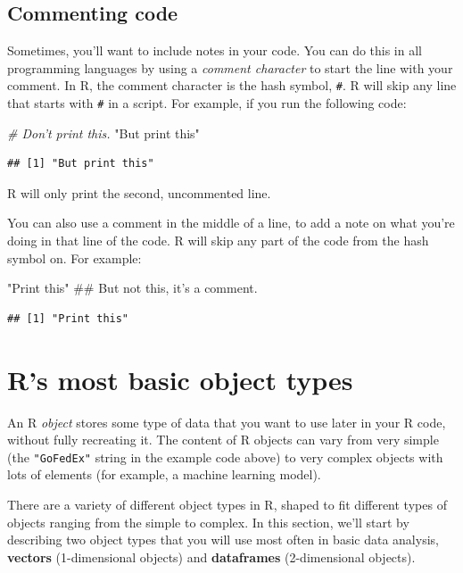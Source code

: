 \documentclass[]{book}
\makeatletter
\newenvironment{Shaded}{\begin{snugshade}}{\end{snugshade}}
\newcommand{\StringTok}[1]{\textcolor[rgb]{0.31,0.60,0.02}{{#1}}}
\newcommand{\CommentTok}[1]{\textcolor[rgb]{0.56,0.35,0.01}{\textit{{#1}}}}
\newcommand{\NormalTok}[1]{{#1}}
\newenvironment{kframe}{%
\medskip{}
\setlength{\fboxsep}{.8em}
 \def\at@end@of@kframe{}%
 \ifinner\ifhmode%
  \def\at@end@of@kframe{\end{minipage}}%
  \begin{minipage}{\columnwidth}%
 \fi\fi%
 \def\FrameCommand##1{\hskip\@totalleftmargin \hskip-\fboxsep
 \colorbox{shadecolor}{##1}\hskip-\fboxsep
     \hskip-\linewidth \hskip-\@totalleftmargin \hskip\columnwidth}%
 \MakeFramed {\advance\hsize-\width
   \@totalleftmargin\z@ \linewidth\hsize
   \@setminipage}}%
 {\par\unskip\endMakeFramed%
 \at@end@of@kframe}
\renewenvironment{Shaded}{\begin{kframe}}{\end{kframe}}
\makeatother
\begin{document}
\subsection{Commenting code}\label{commenting-code}

Sometimes, you'll want to include notes in your code. You can do this in
all programming languages by using a \emph{comment character} to start
the line with your comment. In R, the comment character is the hash
symbol, \texttt{\#}. R will skip any line that starts with \texttt{\#}
in a script. For example, if you run the following code:

\begin{Shaded}
\begin{Highlighting}[]
\CommentTok{# Don't print this.}
\StringTok{"But print this"}
\end{Highlighting}
\end{Shaded}

\begin{verbatim}
## [1] "But print this"
\end{verbatim}

R will only print the second, uncommented line.

You can also use a comment in the middle of a line, to add a note on
what you're doing in that line of the code. R will skip any part of the
code from the hash symbol on. For example:

\begin{Shaded}
\begin{Highlighting}[]
\StringTok{"Print this"} \NormalTok{## But not this, it's a comment.}
\end{Highlighting}
\end{Shaded}

\begin{verbatim}
## [1] "Print this"
\end{verbatim}

\section{R's most basic object types}\label{rs-most-basic-object-types}

An R \emph{object} stores some type of data that you want to use later
in your R code, without fully recreating it. The content of R objects
can vary from very simple (the \texttt{"GoFedEx"} string in the example
code above) to very complex objects with lots of elements (for example,
a machine learning model).

There are a variety of different object types in R, shaped to fit
different types of objects ranging from the simple to complex. In this
section, we'll start by describing two object types that you will use
most often in basic data analysis, \textbf{vectors} (1-dimensional
objects) and \textbf{dataframes} (2-dimensional objects).
\end{document}
